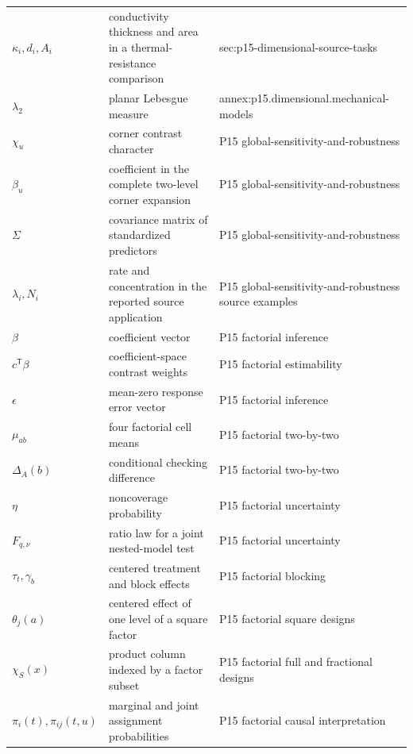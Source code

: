 \begin{longtable}{@{}p{}p{}p{}@{}}
\(\kappa_i,\allowbreak d_i,\allowbreak A_i\) & conductivity thickness and area in a thermal-resistance comparison & sec:\allowbreak{}p15-\allowbreak{}dimensional-\allowbreak{}source-\allowbreak{}tasks \\
\(\lambda_2\) & planar Lebesgue measure & annex:\allowbreak{}p15.\allowbreak{}dimensional.\allowbreak{}mechanical-\allowbreak{}models \\
\(\chi_u\) & corner contrast character & P15 global-\allowbreak{}sensitivity-\allowbreak{}and-\allowbreak{}robustness \\
\(\beta_u\) & coefficient in the complete two-level corner expansion & P15 global-\allowbreak{}sensitivity-\allowbreak{}and-\allowbreak{}robustness \\
\(\Sigma\) & covariance matrix of standardized predictors & P15 global-\allowbreak{}sensitivity-\allowbreak{}and-\allowbreak{}robustness \\
\(\lambda_i,\allowbreak N_i\) & rate and concentration in the reported source application & P15 global-\allowbreak{}sensitivity-\allowbreak{}and-\allowbreak{}robustness source examples \\
\(\beta\) & coefficient vector & P15 factorial inference \\
\(c^{\mathsf T}\beta\) & coefficient-space contrast weights & P15 factorial estimability \\
\(\epsilon\) & mean-zero response error vector & P15 factorial inference \\
\(\mu_{ab}\) & four factorial cell means & P15 factorial two-\allowbreak{}by-\allowbreak{}two \\
\(\Delta_A(b)\) & conditional checking difference & P15 factorial two-\allowbreak{}by-\allowbreak{}two \\
\(\eta\) & noncoverage probability & P15 factorial uncertainty \\
\(F_{q,\nu}\) & ratio law for a joint nested-model test & P15 factorial uncertainty \\
\(\tau_t,\allowbreak \gamma_b\) & centered treatment and block effects & P15 factorial blocking \\
\(\theta_j(a)\) & centered effect of one level of a square factor & P15 factorial square designs \\
\(\chi_S(x)\) & product column indexed by a factor subset & P15 factorial full and fractional designs \\
\(\pi_i(t),\allowbreak \pi_{ij}(t,\allowbreak u)\) & marginal and joint assignment probabilities & P15 factorial causal interpretation \\

\end{longtable}
